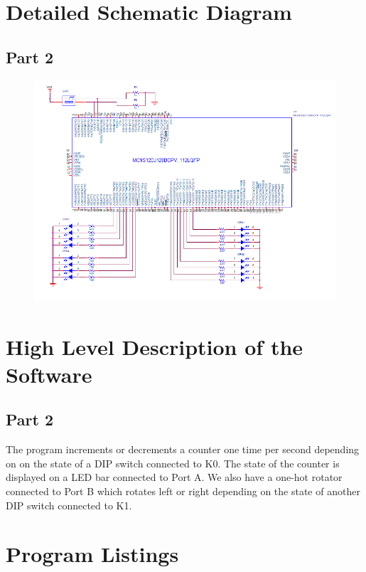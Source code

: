 \documentclass{article}
\begin{document}
\section*{Detailed Schematic Diagram}
\subsection*{Part 2}
\begin{figure}[H]
	\centering
	\includegraphics[width=1\textwidth]{Lab2_part2}
\end{figure}
\section*{High Level Description of the Software}
\subsection*{Part 2}
The program increments or decrements a counter one time per second depending on on the state of a DIP switch connected to K0. The state of the counter is displayed on a LED bar connected to Port A. We also have a one-hot rotator connected to Port B which rotates left or right depending on the state of another DIP switch connected to K1.
\section*{Program Listings}
\end{document}
